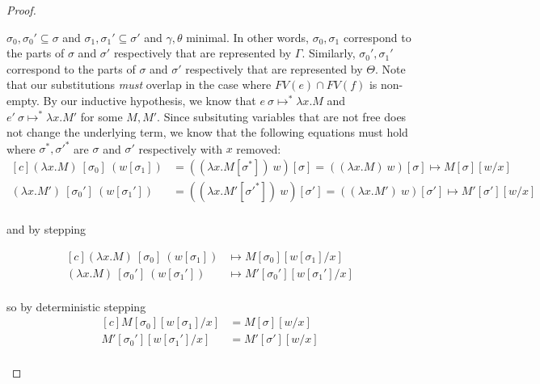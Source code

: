 \begin{proof}
\begin{description}
      $\sigma_0, \sigma_0' \subseteq \sigma$ and 
      $\sigma_1, \sigma_1' \subseteq \sigma'$ and $\gamma, \theta$ minimal.
      In other words, $\sigma_0, \sigma_1$ correspond to the parts of $\sigma$ and $\sigma'$ 
      respectively that are represented by $\Gamma$.
      Similarly, $\sigma_0', \sigma_1'$ correspond to the parts of $\sigma$ and $\sigma'$ 
      respectively that are represented by $\Theta$.
      Note that our substitutions \textit{must} overlap in the case where $FV(e)
      \cap FV(f)$ is non-empty.
      By our inductive hypothesis, we know that 
      $e~\sigma \mapsto^* \lambda x . M$ and 
      $e'~\sigma \mapsto^* \lambda x . M'$ for some $M, M'$.
      Since subsituting variables that are not free does not change the
      underlying term, we know that the following equations must hold where
      $\sigma^*, \sigma'^*$ are $\sigma$ and $\sigma'$ respectively with $x$
      removed:
      \begin{equation}
        \begin{aligned}[c]
          (\lambda x . M)~[\sigma_0]~(w[\sigma_1]) &= 
            ((\lambda x . M[\sigma^*])~w)[\sigma] = 
            ((\lambda x . M)~w)[\sigma] \mapsto
            M[\sigma][w/x] \\
          (\lambda x . M')~[\sigma_0']~(w[\sigma_1']) &= 
            ((\lambda x . M'[\sigma'^*])~w)[\sigma'] = 
            ((\lambda x . M')~w)[\sigma'] \mapsto
            M'[\sigma'][w/x] \\
        \end{aligned}
      \end{equation}

      and by stepping

      \begin{equation}
        \begin{aligned}[c]
          (\lambda x . M)~[\sigma_0]~(w[\sigma_1]) &\mapsto M[\sigma_0][w[\sigma_1]/x] \\
          (\lambda x . M)~[\sigma_0']~(w[\sigma_1']) &\mapsto M'[\sigma_0'][w[\sigma_1']/x] \\
        \end{aligned}
      \end{equation}

      so by deterministic stepping
      \begin{equation}
        \begin{aligned}[c]
          M[\sigma_0][w[\sigma_1]/x] &=
            M[\sigma][w/x] \\
          M'[\sigma_0'][w[\sigma_1']/x] &=
            M'[\sigma'][w/x] \\
        \end{aligned}
      \end{equation}


\end{description}
\end{proof}
